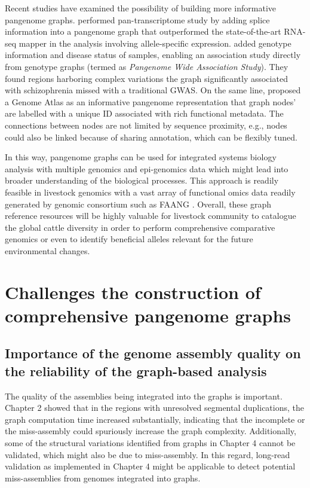 \documentclass[../main.tex]{subfiles}
\begin{document}
Recent studies have examined the possibility of building more informative pangenome graphs. \citet{Sibbesen2021} performed pan-transcriptome study by adding splice information into a pangenome graph that outperformed the state-of-the-art RNA-seq mapper in the analysis involving allele-specific expression. \citet{Hokin2020} added genotype information and disease status of samples, enabling an association study directly from genotype graphs (termed as \emph{Pangenome Wide Association Study}). They found regions harboring complex variations the graph significantly associated with schizophrenia missed with a traditional GWAS. On the same line, \citet{kaye2021genome} proposed a Genome Atlas as an informative pangenome representation that graph nodes’ are labelled with a unique ID associated with rich functional metadata. The connections between nodes are not limited by sequence proximity, e.g., nodes could also be linked because of sharing annotation, which can be flexibly tuned. 

In this way, pangenome graphs can be used for integrated systems biology analysis with multiple genomics and epi-genomics data which might lead into broader understanding of the biological processes. This approach is readily feasible in livestock genomics with a vast array of functional omics data readily generated by genomic consortium such as FAANG \citep{clark2020faang}. Overall, these graph reference resources will be highly valuable for livestock community to catalogue the global cattle diversity in order to perform comprehensive comparative genomics or even to identify beneficial alleles relevant for the future environmental changes.  

\section{Challenges the construction of comprehensive pangenome graphs}

\subsection*{Importance of the genome assembly quality on the reliability of the graph-based analysis}

The quality of the assemblies being integrated into the graphs is important. Chapter 2 showed that in the regions with unresolved segmental duplications, the graph computation time increased substantially, indicating that the incomplete or the miss-assembly could spuriously increase the graph complexity. Additionally, some of the structural variations identified from graphs in Chapter 4 cannot be validated, which might also be due to miss-assembly. 
In this regard, long-read validation as implemented in Chapter 4 might be applicable to detect potential miss-assemblies from genomes integrated into graphs. 
\end{document}

